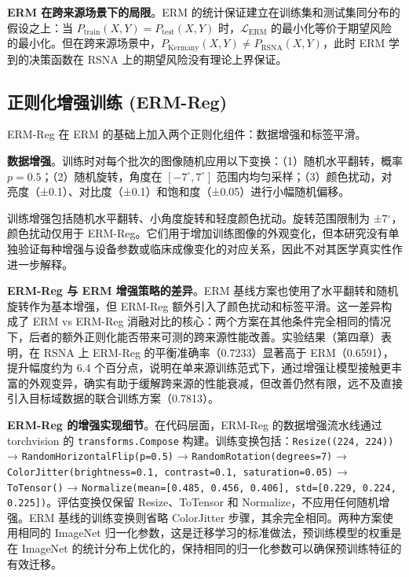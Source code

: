 \documentclass[12pt,a4paper,UTF8,openany]{ctexbook}
\begin{document}
\textbf{ERM 在跨来源场景下的局限}。ERM 的统计保证建立在训练集和测试集同分布的假设之上：当 $P_{\text{train}}(X,Y) = P_{\text{test}}(X,Y)$ 时，$\mathcal{L}_{\text{ERM}}$ 的最小化等价于期望风险的最小化。但在跨来源场景中，$P_{\text{Kermany}}(X,Y) \neq P_{\text{RSNA}}(X,Y)$，此时 ERM 学到的决策函数在 RSNA 上的期望风险没有理论上界保证\cite{gulrajani2021}。

\subsection{正则化增强训练 (ERM-Reg)}

ERM-Reg 在 ERM 的基础上加入两个正则化组件：数据增强和标签平滑。

\textbf{数据增强}。训练时对每个批次的图像随机应用以下变换：（1）随机水平翻转，概率 $p=0.5$；（2）随机旋转，角度在 $[-7^\circ, 7^\circ]$ 范围内均匀采样；（3）颜色扰动，对亮度（±0.1）、对比度（±0.1）和饱和度（±0.05）进行小幅随机偏移。

训练增强包括随机水平翻转、小角度旋转和轻度颜色扰动。旋转范围限制为 ±7$^\circ$，颜色扰动仅用于 ERM-Reg。它们用于增加训练图像的外观变化，但本研究没有单独验证每种增强与设备参数或临床成像变化的对应关系，因此不对其医学真实性作进一步解释。

\textbf{ERM-Reg 与 ERM 增强策略的差异}。ERM 基线方案也使用了水平翻转和随机旋转作为基本增强，但 ERM-Reg 额外引入了颜色扰动和标签平滑。这一差异构成了 ERM vs ERM-Reg 消融对比的核心：两个方案在其他条件完全相同的情况下，后者的额外正则化能否带来可测的跨来源性能改善。实验结果（第四章）表明，在 RSNA 上 ERM-Reg 的平衡准确率（0.7233）显著高于 ERM（0.6591），提升幅度约为 6.4 个百分点，说明在单来源训练范式下，通过增强让模型接触更丰富的外观变异，确实有助于缓解跨来源的性能衰减，但改善仍然有限，远不及直接引入目标域数据的联合训练方案（0.7813）。

\textbf{ERM-Reg 的增强实现细节}。在代码层面，ERM-Reg 的数据增强流水线通过 torchvision 的 \texttt{transforms.Compose} 构建。训练变换包括：\texttt{Resize((224, 224))} → \texttt{RandomHorizontalFlip(p=0.5)} → \texttt{RandomRotation(degrees=7)} → \texttt{ColorJitter(brightness=0.1, contrast=0.1, saturation=0.05)} → \texttt{ToTensor()} → \texttt{Normalize(mean=[0.485, 0.456, 0.406], std=[0.229, 0.224, 0.225])}。评估变换仅保留 Resize、ToTensor 和 Normalize，不应用任何随机增强。ERM 基线的训练变换则省略 ColorJitter 步骤，其余完全相同。两种方案使用相同的 ImageNet 归一化参数，这是迁移学习的标准做法，预训练模型的权重是在 ImageNet 的统计分布上优化的，保持相同的归一化参数可以确保预训练特征的有效迁移。
\end{document}
